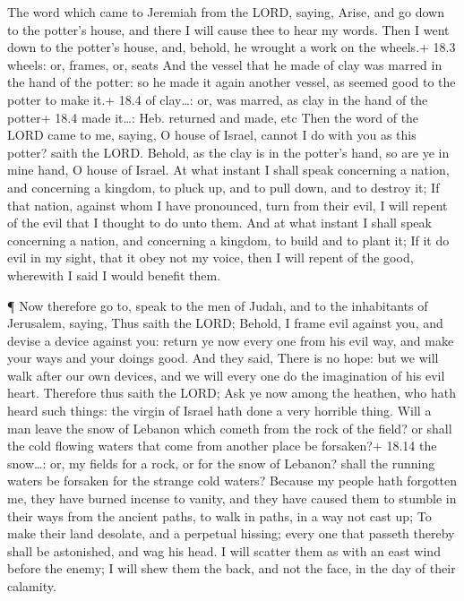  The word which came to Jeremiah from the LORD, saying,
 Arise, and go down to the potter's house, and there I will
cause thee to hear my words.  Then I went down to the
potter's house, and, behold, he wrought a work on the wheels.+ 18.3
wheels: or, frames, or, seats  And the vessel that he made
of clay was marred in the hand of the potter: so he made it again
another vessel, as seemed good to the potter to make it.+ 18.4 of
clay\ldots: or, was marred, as clay in the hand of the potter+ 18.4 made
it\ldots: Heb. returned and made, etc  Then the word of the
LORD came to me, saying,  O house of Israel, cannot I do
with you as this potter? saith the LORD. Behold, as the clay is in the
potter's hand, so are ye in mine hand, O house of Israel. 
At what instant I shall speak concerning a nation, and concerning a
kingdom, to pluck up, and to pull down, and to destroy it; 
If that nation, against whom I have pronounced, turn from their evil, I
will repent of the evil that I thought to do unto them.  And
at what instant I shall speak concerning a nation, and concerning a
kingdom, to build and to plant it;  If it do evil in my
sight, that it obey not my voice, then I will repent of the good,
wherewith I said I would benefit them.

 ¶ Now therefore go to, speak to the men of Judah, and to
the inhabitants of Jerusalem, saying, Thus saith the LORD; Behold, I
frame evil against you, and devise a device against you: return ye now
every one from his evil way, and make your ways and your doings good.
 And they said, There is no hope: but we will walk after
our own devices, and we will every one do the imagination of his evil
heart.  Therefore thus saith the LORD; Ask ye now among the
heathen, who hath heard such things: the virgin of Israel hath done a
very horrible thing.  Will a man leave the snow of Lebanon
which cometh from the rock of the field? or shall the cold flowing
waters that come from another place be forsaken?+ 18.14 the snow\ldots:
or, my fields for a rock, or for the snow of Lebanon? shall the running
waters be forsaken for the strange cold waters?  Because my
people hath forgotten me, they have burned incense to vanity, and they
have caused them to stumble in their ways from the ancient paths, to
walk in paths, in a way not cast up;  To make their land
desolate, and a perpetual hissing; every one that passeth thereby shall
be astonished, and wag his head.  I will scatter them as
with an east wind before the enemy; I will shew them the back, and not
the face, in the day of their calamity.

